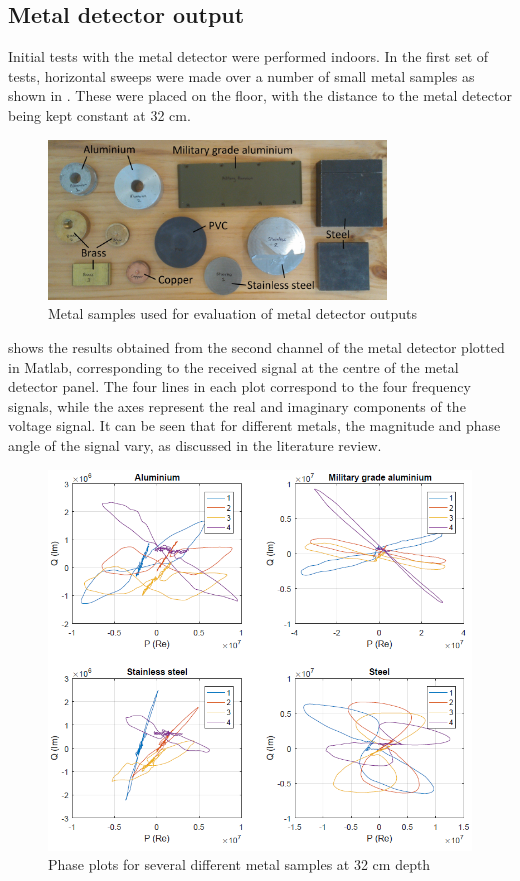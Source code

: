 \documentclass[main.tex]{subfiles}
\begin{document}
\subsection{Metal detector output}
Initial tests with the metal detector were performed indoors. In the first set of tests, horizontal sweeps were made over a number of small metal samples as shown in . These were placed on the floor, with the distance to the metal detector being kept constant at 32 cm. 

\begin{figure}[ht]
\includegraphics[width=0.8\textwidth]{3-ConceptDesign/samples.jpg}
\centering
\caption{Metal samples used for evaluation of metal detector outputs} 
\end{figure}

 shows the results obtained from the second channel of the metal detector plotted in Matlab, corresponding to the received signal at the centre of the metal detector panel. The four lines in each plot correspond to the four frequency signals, while the axes represent the real and imaginary components of the voltage signal. It can be seen that for different metals, the magnitude and phase angle of the signal vary, as discussed in the literature review. 

\begin{figure}[htp]
\includegraphics[width=\textwidth]{3-ConceptDesign/metals.PNG}
\centering
\caption{Phase plots for several different metal samples at 32 cm depth} 
\end{figure}
\end{document}
